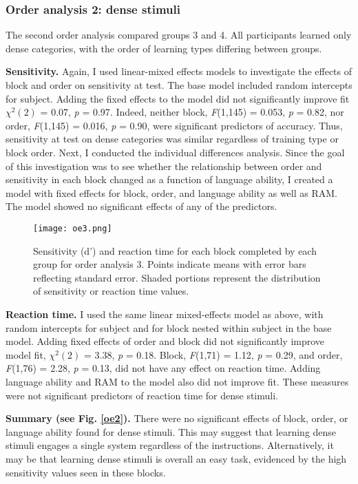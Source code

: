 \documentclass[../dissertation.tex]{subfiles}
\begin{document}
\subsubsection{Order analysis 2: dense stimuli}
	The second order analysis compared groups 3 and 4. All participants learned only dense categories, with the order of learning types differing between groups. \par
	\textbf{Sensitivity.} Again, I used linear-mixed effects models to investigate the effects of block and order on sensitivity at test. The base model included random intercepts for subject. Adding the fixed effects to the model did not significantly improve fit $\chi^{2}(2)$ = 0.07,  \textit{p} = 0.97. Indeed, neither block, \textit{F}(1,145) = 0.053, \textit{p} = 0.82, nor order, \textit{F}(1,145) = 0.016, \textit{p} = 0.90, were significant predictors of accuracy. Thus, sensitivity at test on dense categories was similar regardless of training type or block order.
	Next, I conducted the individual differences analysis. Since the goal of this investigation was to see whether the relationship between order and sensitivity in each block changed as a function of language ability, I created a model with fixed effects for block, order, and language ability as well as RAM. The model showed no significant effects of any of the predictors. \par 
	
\begin{wrapfigure}{R}{0.55\textwidth}
\vspace{-10pt}
\texttt{[image: oe3.png]}
\caption[Sensitivity and reaction time for order analysis 3]{Sensitivity (d')  and reaction time for each block completed by each group for order analysis 3. Points indicate means with error bars reflecting standard error. Shaded portions represent the distribution of sensitivity or reaction time values.}
\label{oe3}
\vspace{-15pt}
\end{wrapfigure}	
	
	
	\textbf{Reaction time.} I used the same linear mixed-effects model as above, with random intercepts for subject and for block nested within subject in the base model. Adding fixed effects of order and block did not significantly improve model fit, $\chi^{2}(2)$ = 3.38, \textit{p} = 0.18. Block, \textit{F}(1,71) = 1.12, \textit{p} = 0.29, and order, \textit{F}(1,76) = 2.28, \textit{p} = 0.13, did not have any effect on reaction time. Adding language ability and RAM to the model also did not improve fit. These measures were not significant predictors of reaction time for dense stimuli.\par
	\textbf{Summary (see Fig. \ref{oe2}).} There were no significant effects of block, order, or language ability found for dense stimuli. This may suggest that learning dense stimuli engages a single system regardless of the instructions. Alternatively, it may be that learning dense stimuli is overall an easy task, evidenced by the high sensitivity values seen in these blocks.
	
\end{document}
